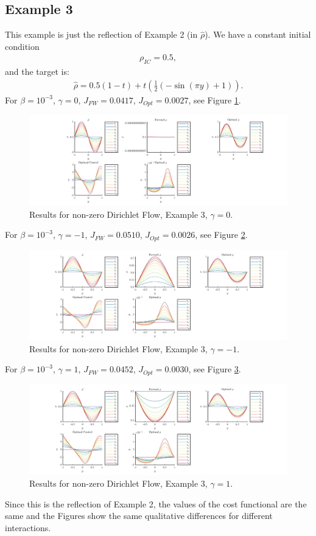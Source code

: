 \documentclass[11pt, a4paper]{article}
\theoremstyle{definition}
\begin{document}
\subsection{Example 3}
This example is just the reflection of Example 2 (in $\hat \rho$). We have a constant initial condition 
\begin{align*}
\rho_{IC}= 0.5,
\end{align*}
and the target is:
\begin{align*}
\hat \rho = 0.5(1-t) + t(\frac{1}{2}(-\sin(\pi y ) +1)).
\end{align*}
For $\beta = 10^{-3}$, $\gamma = 0$, $J_{FW} = 0.0417$, $J_{Opt} = 0.0027$, see Figure \ref{Res3D05}.
\begin{figure}[h]
	\includegraphics[scale=0.3]{ResD053.jpg}
	\caption{Results for non-zero Dirichlet Flow, Example $3$, $\gamma = 0$.}
	\label{Res3D05}
\end{figure}
For $\beta = 10^{-3}$, $\gamma = -1$, $J_{FW} = 0.0510$, $J_{Opt} = 0.0026$, see Figure \ref{Res3aD05}.
\begin{figure}[h]
	\includegraphics[scale=0.3]{ResD053a.jpg}
	\caption{Results for non-zero Dirichlet Flow, Example $3$, $\gamma = -1$.}
	\label{Res3aD05}
\end{figure}
For $\beta = 10^{-3}$, $\gamma = 1$, $J_{FW} = 0.0452$, $J_{Opt} = 0.0030$, see Figure \ref{Res3bD05}.
\begin{figure}[h]
	\includegraphics[scale=0.3]{ResD053b.jpg}
	\caption{Results for non-zero Dirichlet Flow, Example $3$, $\gamma = 1$.}
	\label{Res3bD05}
\end{figure}
Since this is the reflection of Example 2, the values of the cost functional are the same and the Figures show the same qualitative differences for different interactions.
\end{document}
